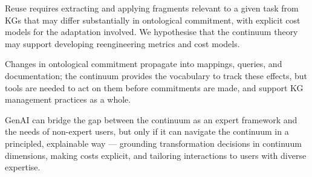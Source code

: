 \documentclass[runningheads]{llncs}
\begin{document}
\smallskip{}
Reuse requires extracting and applying fragments relevant 
to a given task from KGs that may differ substantially in 
ontological commitment, with explicit cost models for the adaptation involved. We hypothesise that the continuum theory may support developing reengineering metrics and cost models.

\smallskip{}
Changes in ontological commitment propagate into mappings, 
queries, and documentation; the continuum provides the 
vocabulary to track these effects, but tools are needed to 
act on them before commitments are made, and support KG management practices as a whole.

\smallskip{}
GenAI can bridge the gap between the continuum as an 
expert framework and the needs of non-expert users, but 
only if it can navigate the continuum in a principled, 
explainable way --- grounding transformation decisions in 
continuum dimensions, making costs explicit, and tailoring interactions to users with diverse expertise.
\end{document}
